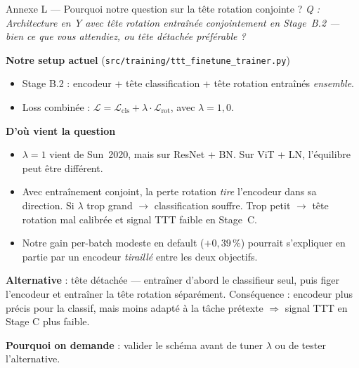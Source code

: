\documentclass[10pt,aspectratio=169]{beamer}
\newcommand{\code}[1]{\texttt{\small #1}}
\newcommand{\qbox}[1]{\textit{\textcolor{accent}{Q : #1}}\par\smallskip}
\begin{document}
\begin{frame}{Annexe L --- Pourquoi notre question sur la tête rotation conjointe ?}
  \qbox{\guillemotleft\,Architecture en Y avec tête rotation entraînée conjointement en Stage~B.2 --- bien ce que vous attendiez, ou tête détachée préférable ?\,\guillemotright{}}

  \textbf{Notre setup actuel} (\code{src/training/ttt\_finetune\_trainer.py})
  \begin{itemize}\small
    \item Stage B.2 : encodeur + tête classification + tête rotation entraînés \emph{ensemble}.
    \item Loss combinée : $\mathcal{L} = \mathcal{L}_{\text{cls}} + \lambda \cdot \mathcal{L}_{\text{rot}}$, avec $\lambda = 1{,}0$.
  \end{itemize}

  \textbf{D'où vient la question}
  \begin{itemize}\small
    \item $\lambda = 1$ vient de Sun~2020, mais sur \alert{ResNet + BN}. Sur \alert{ViT + LN}, l'équilibre peut être différent.
    \item Avec entraînement conjoint, la perte rotation \emph{tire} l'encodeur dans sa direction. Si $\lambda$ trop grand $\to$ classification souffre. Trop petit $\to$ tête rotation mal calibrée et signal TTT faible en Stage~C.
    \item Notre gain per-batch modeste en default ($+0{,}39$\,\%) pourrait s'expliquer en partie par un encodeur \emph{tiraillé} entre les deux objectifs.
  \end{itemize}

  \textbf{Alternative} : tête détachée --- entraîner d'abord le classifieur seul, puis figer l'encodeur et entraîner la tête rotation séparément. Conséquence : encodeur plus précis pour la classif, mais moins adapté à la tâche prétexte $\Rightarrow$ signal TTT en Stage C plus faible.

  \textbf{Pourquoi on demande} : valider le schéma avant de tuner $\lambda$ ou de tester l'alternative.
\end{frame}
\end{document}
